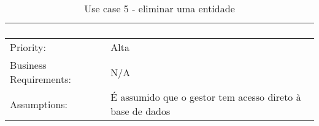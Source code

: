 \documentclass{scrreprt}
\begin{document}
\begin{table}[H]
\begin{adjustbox}{width=1.2\textwidth,center=\textwidth}
\begin{tabular}{|m{4cm}|m{12cm}|}
\begin{enumerate}
            \end{enumerate} \\
            \hline
            Priority: & Alta \\
            \hline
            Business Requirements: & N/A \\
            \hline
            Assumptions: & É assumido que o gestor tem acesso direto à base de dados \\
            \hline
        \end{tabular}
    \end{adjustbox}
    \caption{Use case 5 - eliminar uma entidade}
    \label{use case 5}
\end{table}

\end{document}
